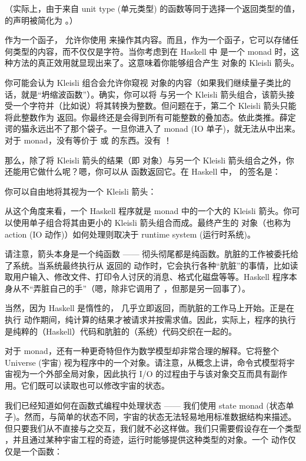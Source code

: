 （实际上，由于来自 unit type (单元类型) 的函数等同于选择一个返回类型的值， 的声明被简化为 。）

作为一个函子， 允许你使用  来操作其内容。而且，作为一个函子，它可以存储任何类型的内容，而不仅仅是字符。当你考虑到在 Haskell 中  是一个 monad 时，这种方法的真正效用就显现出来了。这意味着你能够组合产生  对象的 Kleisli 箭头。

你可能会认为 Kleisli 组合会允许你窥视  对象的内容（如果我们继续量子类比的话，就是“坍缩波函数”）。确实，你可以将  与另一个 Kleisli 箭头组合，该箭头接受一个字符并（比如说）将其转换为整数。但问题在于，第二个 Kleisli 箭头只能将此整数作为  返回。你最终还是会得到所有可能整数的叠加态。依此类推。薛定谔的猫永远出不了那个袋子。一旦你进入了  monad (IO 单子)，就无法从中出来。对于  monad，没有等价于  或  的东西。没有 ！

那么，除了将 Kleisli 箭头的结果（即  对象）与另一个 Kleisli 箭头组合之外，你还能用它做什么呢？嗯，你可以从  函数返回它。在 Haskell 中， 的签名是：

你可以自由地将其视为一个 Kleisli 箭头：

从这个角度来看，一个 Haskell 程序就是  monad 中的一个大的 Kleisli 箭头。你可以使用单子组合将其由更小的 Kleisli 箭头组合而成。最终产生的  对象（也称为  action (IO 动作)）如何处理则取决于 runtime system (运行时系统)。

请注意，箭头本身是一个纯函数 —— 彻头彻尾都是纯函数。肮脏的工作被委托给了系统。当系统最终执行从  返回的  动作时，它会执行各种“肮脏”的事情，比如读取用户输入、修改文件、打印令人讨厌的消息、格式化磁盘等等。Haskell 程序本身从不“弄脏自己的手”（嗯，除非它调用了 ，但那是另一回事了）。

当然，因为 Haskell 是惰性的， 几乎立即返回，而肮脏的工作马上开始。正是在执行  动作期间，纯计算的结果才被请求并按需求值。因此，实际上，程序的执行是纯粹的（Haskell）代码和肮脏的（系统）代码交织在一起的。

对于  monad，还有一种更奇特但作为数学模型却非常合理的解释。它将整个 Universe (宇宙) 视为程序中的一个对象。请注意，从概念上讲，命令式模型将宇宙视为一个外部全局对象，因此执行 I/O 的过程由于与该对象交互而具有副作用。它们既可以读取也可以修改宇宙的状态。

我们已经知道如何在函数式编程中处理状态 —— 我们使用 state monad (状态单子)。然而，与简单的状态不同，宇宙的状态无法轻易地用标准数据结构来描述。但只要我们从不直接与之交互，我们就不必这样做。我们只需要假设存在一个类型 ，并且通过某种宇宙工程的奇迹，运行时能够提供这种类型的对象。一个  动作仅仅是一个函数：

